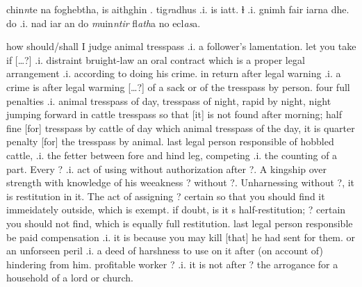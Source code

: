 \documentclass[11pt]{article}
\begin{document}
\begin{pages}
\begin{Leftside}
chin\emph{n}te na foghebtha, is aithghin .   tig\emph{r}adhus .i. is    iatt. ɫ  .i. gnimh   fair iarna  dhe.  do  .i. nad iar  an  do \emph{m}uin\emph{ntir} fl\emph{ath}a no ecl\emph{as}a. 
    \pend
  \endnumbering
  \end{Leftside}

 \begin{Rightside}
    \beginnumbering\pstart  
    how should/shall I judge animal tresspass .i. a follower's lamentation.  let you take if [\ldots?] .i. distraint bruight-law an oral contract which is a proper legal arrangement .i. according to doing his crime.  in return after legal warning .i. a crime is after legal warming [\ldots?] of a sack or of the tresspass by person.  four full penalties .i. animal tresspass of day, tresspass of night, rapid by night, night jumping forward in cattle tresspass so that [it] is not found after morning;  half fine [for] tresspass by cattle of day which animal tresspass of the day, it is quarter penalty [for] the tresspass by animal.  last legal person responsible of hobbled cattle, .i. the fetter between fore and hind leg, competing .i. the counting of a part. Every ? .i. act of using without authorization after ?. A kingship over strength with knowledge of his weeakness ? without ?.  Unharnessing without ?, it is restitution in it.  The act of assigning ? certain so that you should find it immeidately outside, which is exempt.  if doubt, is it s half-restitution; ? certain you should not find, which is equally full restitution.  last legal person responsible be paid compensation .i. it is because you may kill [that] he had sent for them.  or an unforseen peril .i. a deed of harshness to use on it after (on account of) hindering from him. profitable worker ? .i. it is not after ? the arrogance for a household of a lord or church.
    \pend
    \endnumbering
  \end{Rightside}

  \Pages
\end{pages}
\end{document}
